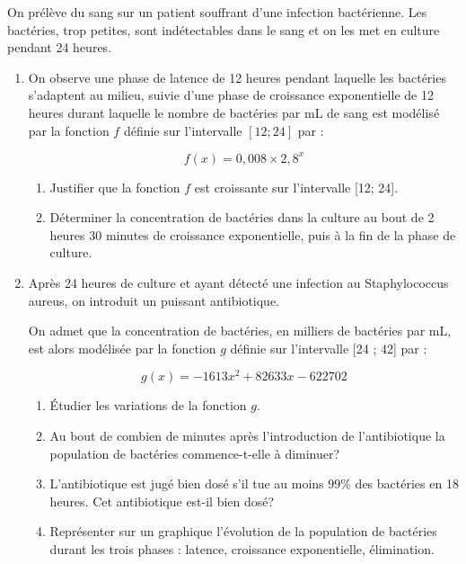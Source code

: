 \documentclass[french]{book}
\begin{document}
\begin{exocor}
On prélève du sang sur un patient souffrant d'une infection bactérienne. Les bactéries, trop petites, sont indétectables dans le sang et on les met en culture pendant 24 heures.

\begin{enumerate}
\item On observe une phase de latence de 12 heures pendant laquelle les bactéries s'adaptent au milieu, suivie d'une phase de croissance exponentielle de 12 heures durant laquelle le nombre de bactéries par $\mathrm{mL}$ de sang est modélisé par la fonction $f$ définie sur l'intervalle $[12 ; 24]$ par :

$$
f(x)=0,008 \times 2,8^{x}
$$

\begin{enumerate}
\item Justifier que la fonction $f$ est croissante sur l'intervalle [12; 24].

\item Déterminer la concentration de bactéries dans la culture au bout de 2 heures $30$ minutes de croissance exponentielle, puis à la fin de la phase de culture.
\end{enumerate}

\item Après 24 heures de culture et ayant détecté une infection au Staphylococcus aureus, on introduit un puissant antibiotique.

On admet que la concentration de bactéries, en milliers de bactéries par mL, est alors modélisée par la fonction $g$ définie sur l'intervalle [24 ; 42] par :

$$
g(x)=-1613 x^{2}+82633 x-622702
$$

\begin{enumerate}
\item Étudier les variations de la fonction $g$.

\item Au bout de combien de minutes après l'introduction de l'antibiotique la population de bactéries commence-t-elle à diminuer?

\item L'antibiotique est jugé bien dosé s'il tue au moins $99 \%$ des bactéries en 18 heures. Cet antibiotique est-il bien dosé?

\item Représenter sur un graphique l'évolution de la population de bactéries durant les trois phases : latence, croissance exponentielle, élimination.
\end{enumerate}
\end{enumerate}
\end{exocor}
\end{document}
